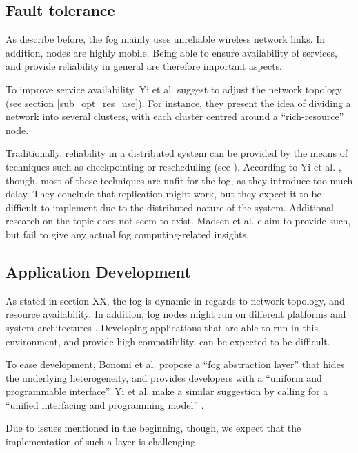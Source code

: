\documentclass{article}
\begin{document}
\subsection{Fault tolerance}
As describe before, the fog mainly uses unreliable wireless network links. In addition, nodes are highly mobile. Being able to ensure availability of services, and provide reliability in general are therefore important aspects.

To improve service availability, Yi et al. \cite{yi2015survey} suggest to adjust the network topology (see section \ref{sub_opt_res_use}). For instance, they present the idea of dividing a network into several clusters, with each cluster centred around a ``rich-resource'' node.

Traditionally, reliability in a distributed system can be provided by the means of techniques such as checkpointing or rescheduling (see \cite{tanebaum2013}). According to Yi et al. \cite{yi2015survey}, though, most of these techniques are unfit for the fog, as they introduce too much delay. They conclude that replication might work, but they expect it to be difficult to implement due to the distributed nature of the system. Additional research on the topic does not seem to exist. Madsen et al. \cite{madsen2013reliability} claim to provide such, but fail to give any actual fog computing-related insights.



\subsection{Application Development}
As stated in section XX, the fog is dynamic in regards to network topology, and resource availability. In addition, fog nodes might run on different platforms and system architectures \cite{yi2015survey}. Developing applications that are able to run in this environment, and provide high compatibility, can be expected to be difficult. 

To ease development, Bonomi et al. \cite{bonomi2014fog} propose a ``fog abstraction layer'' that hides the underlying heterogeneity, and provides developers with a ``uniform and programmable interface''. Yi et al. make a similar suggestion by calling for a ``unified interfacing and programming model'' \cite{yi2015survey}.

Due to issues mentioned in the beginning, though, we expect that the implementation of such a layer is challenging.
\end{document}
